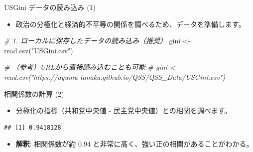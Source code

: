 \documentclass[
  ignorenonframetext,
]{beamer}
\newenvironment{Shaded}{\begin{snugshade}}{\end{snugshade}}
\newcommand{\AttributeTok}[1]{\textcolor[rgb]{0.77,0.63,0.00}{#1}}
\newcommand{\CommentTok}[1]{\textcolor[rgb]{0.56,0.35,0.01}{\textit{#1}}}
\newcommand{\DecValTok}[1]{\textcolor[rgb]{0.00,0.00,0.81}{#1}}
\newcommand{\FunctionTok}[1]{\textcolor[rgb]{0.00,0.00,0.00}{#1}}
\newcommand{\NormalTok}[1]{#1}
\newcommand{\OtherTok}[1]{\textcolor[rgb]{0.56,0.35,0.01}{#1}}
\newcommand{\SpecialCharTok}[1]{\textcolor[rgb]{0.00,0.00,0.00}{#1}}
\newcommand{\StringTok}[1]{\textcolor[rgb]{0.31,0.60,0.02}{#1}}
\providecommand{\tightlist}{%
  \setlength{\itemsep}{0pt}\setlength{\parskip}{0pt}}
\begin{document}
\begin{frame}[fragile]{USGini データの読み込み (1)}
\protect\hypertarget{usgini-ux30c7ux30fcux30bfux306eux8aadux307fux8fbcux307f-1}{}
\begin{itemize}
\tightlist
\item
  政治の分極化と経済的不平等の関係を調べるため、データを準備します。
\end{itemize}

\scriptsize

\begin{Shaded}
\begin{Highlighting}[]
\CommentTok{\# 1. ローカルに保存したデータの読み込み（推奨）}
\NormalTok{gini }\OtherTok{\textless{}{-}} \FunctionTok{read.csv}\NormalTok{(}\StringTok{"USGini.csv"}\NormalTok{)}

\CommentTok{\# （参考）URLから直接読み込むことも可能}
\CommentTok{\# gini \textless{}{-} read.csv("https://ayumu{-}tanaka.github.io/QSS/QSS\_Data/USGini.csv")}
\end{Highlighting}
\end{Shaded}

\normalsize
\end{frame}

\begin{frame}[fragile]{相関係数の計算 (2)}
\protect\hypertarget{ux76f8ux95a2ux4fc2ux6570ux306eux8a08ux7b97-2}{}
\begin{itemize}
\tightlist
\item
  分極化の指標（共和党中央値 - 民主党中央値）との相関を調べます。
\end{itemize}

\scriptsize

\begin{Shaded}
\end{Shaded}

\begin{verbatim}
## [1] 0.9418128
\end{verbatim}

\normalsize

\begin{itemize}
\tightlist
\item
  \textbf{解釈}: 相関係数が約 0.94
  と非常に高く、強い正の相関があることがわかる。
\end{itemize}
\end{frame}
\end{document}
